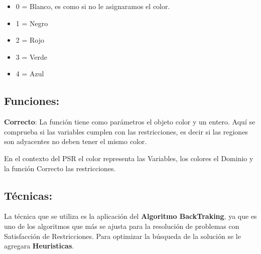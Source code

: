 \documentclass[a4paper]{article}
\begin{document}
\begin{itemize}
	
\item 0 = Blanco, es como si no le asignaramos el color.
\item 1 = Negro
\item 2 = Rojo 
\item 3 = Verde 
\item 4 = Azul
\end{itemize}

\subsection*{Funciones:}
\textbf{Correcto}: La función tiene como parámetros el objeto color y un entero. Aquí se comprueba si las variables cumplen con las restricciones, es decir si las regiones son adyacentes no deben tener el mismo color. 

En el contexto del PSR el color representa las Variables, los colores el Dominio y la función Correcto las restricciones.

\subsection*{Técnicas:}
La técnica que se utiliza es la aplicación del \textbf{Algoritmo BackTraking}, ya que es uno de los algoritmos que más se ajusta para la resolución de problemas con Satisfacción de Restricciones.
Para optimizar la búsqueda de la solución se le agregara \textbf{Heuristicas}.
\end{document}
